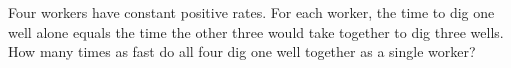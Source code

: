 Four workers have constant positive rates. For each worker, the time to dig one well alone equals the time the other three would take together to dig three wells. How many times as fast do all four dig one well together as a single worker?
